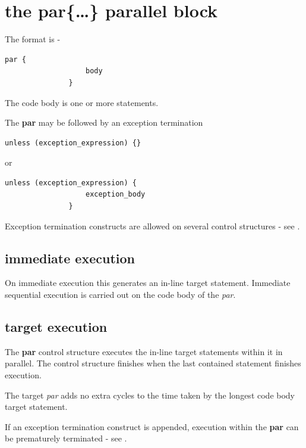     \section{the {\bf par\{\dots\}} parallel block}

        The format is -
        \begin{lstlisting}[gobble=8, language=threepl]
               par {
                   body
               }
        \end{lstlisting}
        The code body is one or more statements.
        
        The {\bf par} may be followed by an exception termination

        \begin{lstlisting}[gobble=8, language=threepl]
               unless (exception_expression) {}
        \end{lstlisting}
        or
        \begin{lstlisting}[gobble=8, language=threepl]
               unless (exception_expression) {
                   exception_body
               }
        \end{lstlisting}
        
        Exception termination constructs are allowed on several control structures
        - see .
        
        \subsection{immediate execution}
        
            On immediate execution this generates an in-line target statement.
            Immediate sequential execution is carried out on the code body
            of the {\em par}.
        
        \subsection{target execution}

            The {\bf par} control structure executes the in-line target
            statements within it in parallel. The control structure
            finishes when the last contained statement finishes execution.
            
            The target {\em par} adds no extra cycles to the time taken
            by the longest code body target statement.

            If an exception termination construct is appended, execution within
            the {\bf par} can be prematurely terminated
            - see .



